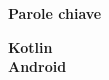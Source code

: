 
\newcommand{\clearemptydoublepage}{\newpage{\pagestyle{empty}%
    \cleardoublepage}}
\clearemptydoublepage
\thispagestyle{empty}
\vspace*{20ex}
\begin{flushright}
    \begin{LARGE}
        \textbf{Parole chiave}\\
        \vspace{5ex}
    \end{LARGE}
    \begin{normalsize}
        \textbf{%
            Kotlin\\%
            Android\\%
            \medskip
        }
    \end{normalsize}
\end{flushright}
\vfill
\clearemptydoublepage
